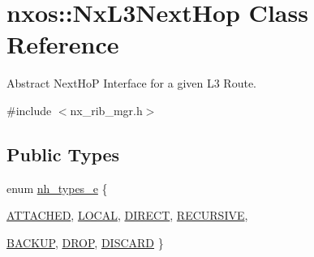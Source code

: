 \hypertarget{classnxos_1_1NxL3NextHop}{
\section{nxos::NxL3NextHop Class Reference}
\label{classnxos_1_1NxL3NextHop}
}


Abstract NextHoP Interface for a given L3 Route.  


{\ttfamily \#include $<$nx\_\-rib\_\-mgr.h$>$}\subsection*{Public Types}
\begin{DoxyCompactItemize}
\item 
enum \hyperlink{classnxos_1_1NxL3NextHop_ab58475e35a53b76cb9bdbfde04d537f3}{nh\_\-types\_\-e} \{ \par
\hyperlink{classnxos_1_1NxL3NextHop_ab58475e35a53b76cb9bdbfde04d537f3a912838c6148906933372bc719e6778b7}{ATTACHED}, 
\hyperlink{classnxos_1_1NxL3NextHop_ab58475e35a53b76cb9bdbfde04d537f3ab073691a46b4482d1214e0da55f41587}{LOCAL}, 
\hyperlink{classnxos_1_1NxL3NextHop_ab58475e35a53b76cb9bdbfde04d537f3a9259cb9dba5a62192e20458524d93bfa}{DIRECT}, 
\hyperlink{classnxos_1_1NxL3NextHop_ab58475e35a53b76cb9bdbfde04d537f3a6fb806fc312c9cc04dd11c1d0b772c2b}{RECURSIVE}, 
\par
\hyperlink{classnxos_1_1NxL3NextHop_ab58475e35a53b76cb9bdbfde04d537f3ae078b4acb489b4d29214764fe732bd5e}{BACKUP}, 
\hyperlink{classnxos_1_1NxL3NextHop_ab58475e35a53b76cb9bdbfde04d537f3af0d20d4eed57271845ddcb39a2451ce5}{DROP}, 
\hyperlink{classnxos_1_1NxL3NextHop_ab58475e35a53b76cb9bdbfde04d537f3a71e4b55f7ef95579440ef91cc247c2c7}{DISCARD}
 \}
\end{DoxyCompactItemize}
